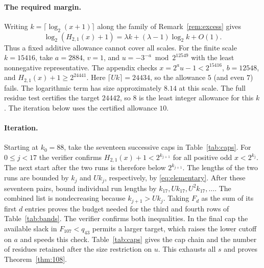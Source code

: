 \documentclass[11pt]{article}
\theoremstyle{definition}
\begin{document}
\paragraph{The required margin.}
Writing \(k=\lceil\log_2(x+1)\rceil\) along the family of
Remark~\ref{rem:excess} gives
\[
 \log_2(H_{2,1}(x)+1)=\lambda k+(\lambda-1)\log_2 k+O(1).
\]
Thus a fixed additive allowance cannot cover all scales.
For the finite scale \(k=15416\), take
\(a=2884\), \(v=1\), and \(u=-3^{-a}\bmod 2^{12549}\)
with the least nonnegative representative. The appendix
checks \(x=2^a u-1<2^{15416}\), \(b=12548\), and
\(H_{2,1}(x)+1\ge2^{24441}\). Here
\(\lceil Uk\rceil=24434\), so the allowance \(5\) (and even
\(7\)) fails. The logarithmic term has size approximately
\(8.14\) at this scale. The full residue test certifies the
target \(24442\), so \(8\) is the least integer allowance for
this \(k\). The iteration below uses the certified allowance \(10\).

\paragraph{Iteration.}
Starting at \(k_0=88\), take the seventeen successive caps
in Table~\ref{tab:caps}. For \(0\le j<17\) the verifier confirms
\(H_{2,1}(x)+1<2^{k_{j+1}}\) for all positive odd \(x<2^{k_j}\).
The next start after the two runs is therefore below \(2^{k_{j+1}}\).
The lengths of the two runs are bounded by \(k_j\) and \(Uk_j\),
respectively, by \eqref{eq:elementary}. After these seventeen pairs,
bound individual run lengths by \(k_{17},Uk_{17},U^2 k_{17},\ldots\).
The combined list is nondecreasing because \(k_{j+1}>Uk_j\).
Taking \(F_d\) as the sum of its first \(d\) entries proves the
budget needed for the third and fourth rows of Table~\ref{tab:bands}.
The verifier confirms both inequalities. In the final cap the
available slack in \(F_{107}<q_{43}\) permits a larger target,
which raises the lower cutoff on \(a\) and speeds this check.
Table~\ref{tab:caps}
gives the cap chain and the number of residues retained after
the size restriction on \(u\). This exhausts all \(s\) and proves
Theorem~\ref{thm:108}.
\end{document}

